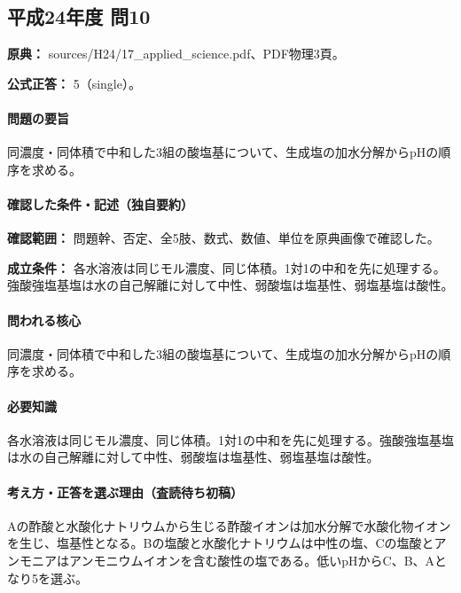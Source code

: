 \subsection{平成24年度 問10}
\label{q:h24-reg-applied-10}

\noindent\textbf{原典：} sources/H24/17\_applied\_science.pdf、PDF物理3頁。

\textbf{公式正答：} 5（single）。

\paragraph{問題の要旨} 同濃度・同体積で中和した3組の酸塩基について、生成塩の加水分解からpHの順序を求める。

\paragraph{確認した条件・記述（独自要約）}\mbox{}\par

\noindent\textbf{確認範囲：} 問題幹、否定、全5肢、数式、数値、単位を原典画像で確認した。\par

\noindent\textbf{成立条件：} 各水溶液は同じモル濃度、同じ体積。1対1の中和を先に処理する。強酸強塩基塩は水の自己解離に対して中性、弱酸塩は塩基性、弱塩基塩は酸性。\par

\paragraph{問われる核心} 同濃度・同体積で中和した3組の酸塩基について、生成塩の加水分解からpHの順序を求める。

\paragraph{必要知識} 各水溶液は同じモル濃度、同じ体積。1対1の中和を先に処理する。強酸強塩基塩は水の自己解離に対して中性、弱酸塩は塩基性、弱塩基塩は酸性。

\paragraph{考え方・正答を選ぶ理由（査読待ち初稿）} Aの酢酸と水酸化ナトリウムから生じる酢酸イオンは加水分解で水酸化物イオンを生じ、塩基性となる。Bの塩酸と水酸化ナトリウムは中性の塩、Cの塩酸とアンモニアはアンモニウムイオンを含む酸性の塩である。低いpHからC、B、Aとなり5を選ぶ。

